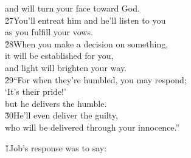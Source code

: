 \begin{poetry}
\poemll    and will turn your face toward God. \\
\poeml \v{27}You'll entreat him and he'll listen to you \\
\poemll    as you fulfill your vows. \\
\poeml \v{28}When you make a decision on something, \\
\poemll    it will be established for you, \\
\poemlll       and light will brighten your way. \\
\poeml \v{29}``For when they're humbled, you may respond; \\
\poemll    `It's their pride!' \\
\poemlll       but he delivers the humble. \\
\poeml \v{30}He'll even deliver the guilty, \\
\poemll    who will be delivered through your innocence.''
\end{poetry}

\v{1}Job's response was to say:

